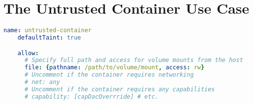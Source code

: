 \section{The Untrusted Container Use Case}


\begin{lstlisting}[language=yaml, gobble=4,
  caption={[Confining an untrusted container with \bpfcontain{}]
    Confining an untrusted container with \bpfcontain{}. \bpfcontain{}'s default
    enforcement policy of defining a boundary around the container enables this policy to
    be quite simple. A default-tainted policy enables container-level confinement without
    specifying \textit{any} rules whatsoever. This policy can then be adjusted as
    required, specifying file rules to provision access to volume mounts, network rules to
    enable networking, and capability rules to enable access to specific POSIX
    capabilities.
  },
  label={lst:bpfcontain-untrusted}, float]
    name: untrusted-container
    defaultTaint: true

    allow:
      # Specify full path and access for volume mounts from the host
      file: {pathname: /path/to/volume/mount, access: rw}
      # Uncomment if the container requires networking
      # net: any
      # Uncomment if the container requires any capabilities
      # capability: [capDacOverrride] # etc.
\end{lstlisting}


